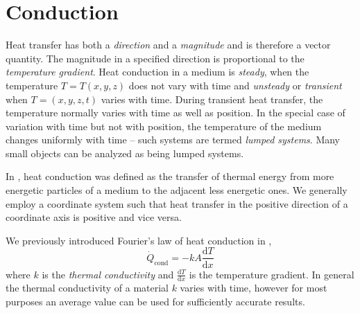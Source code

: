 

\section{Conduction} \label{sec:conduction}
Heat transfer has both a \textit{direction} and a \textit{magnitude} and is therefore a vector quantity.
The magnitude in a specified direction is proportional to the \textit{temperature gradient}.
Heat conduction in a medium is \textit{steady}, when the temperature $T = T(x,y,z)$ does not vary with time and \textit{unsteady} or \textit{transient} when $T =(x,y,z,t)$ varies with time.
During transient heat transfer, the temperature normally varies with time as well as position.
In the special case of variation with time but not with position, the temperature of the medium changes uniformly with time -- such systems are termed \textit{lumped systems}.
Many small objects can be analyzed as being lumped systems.

In , heat conduction was defined as the transfer of thermal energy from more energetic particles of a medium to the adjacent less energetic ones.
We generally employ a coordinate system such that heat transfer in the positive direction of a coordinate axis is positive and vice versa.

We previously introduced Fourier's law of heat conduction in ,
\begin{equation*}
  \dot{Q}_{\text{cond}} = -kA \frac{\mathrm{d}T}{\mathrm{d}x} 
\end{equation*}
where $k$ is the \textit{thermal conductivity} and $\frac{\mathrm{d}T}{\mathrm{d}x} $ is the temperature gradient.
In general the thermal conductivity of a material $k$ varies with time, however for most purposes an average value can be used for sufficiently accurate results.

